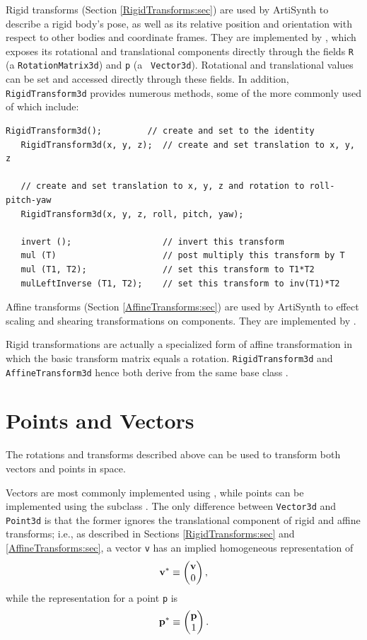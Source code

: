 Rigid transforms (Section \ref{RigidTransforms:sec}) are used by
ArtiSynth to describe a rigid body's pose, as well as its relative
position and orientation with respect to other bodies and coordinate
frames.  They are implemented by
, which exposes its
rotational and translational components directly through the fields
{\tt R} (a {\tt RotationMatrix3d}) and {\tt p} (a {\tt
Vector3d}). Rotational and translational values can be set and
accessed directly through these fields.  In addition, {\tt
RigidTransform3d} provides numerous methods, some of the more commonly
used of which include:
\begin{lstlisting}[]
   RigidTransform3d();         // create and set to the identity
   RigidTransform3d(x, y, z);  // create and set translation to x, y, z

   // create and set translation to x, y, z and rotation to roll-pitch-yaw
   RigidTransform3d(x, y, z, roll, pitch, yaw);

   invert ();                  // invert this transform
   mul (T)                     // post multiply this transform by T
   mul (T1, T2);               // set this transform to T1*T2
   mulLeftInverse (T1, T2);    // set this transform to inv(T1)*T2
\end{lstlisting}
%

Affine transforms (Section \ref{AffineTransforms:sec}) are used by
ArtiSynth to effect scaling and shearing transformations on
components. They are implemented by
.

Rigid transformations are actually a specialized form of affine
transformation in which the basic transform matrix equals a rotation.
{\tt RigidTransform3d} and {\tt AffineTransform3d} hence both derive
from the same base class
.

\section{Points and Vectors}

The rotations and transforms described above can be used to transform
both vectors and points in space.

Vectors are most commonly implemented using
, while points can be implemented
using the subclass .  The only
difference between {\tt Vector3d} and {\tt Point3d} is that the former
ignores the translational component of rigid and affine transforms;
i.e., as described in Sections \ref{RigidTransforms:sec} and
\ref{AffineTransforms:sec}, a vector {\tt v} has
an implied homogeneous representation of
%
\begin{equation}
{\bf v}^* \equiv \left(\begin{matrix} {\bf v} \\ 0 \end{matrix}\right),
\end{equation}
%
while the representation for a point {\tt p} is
%
\begin{equation}
{\bf p}^* \equiv \left(\begin{matrix} {\bf p} \\ 1 \end{matrix}\right).
\end{equation}
%

